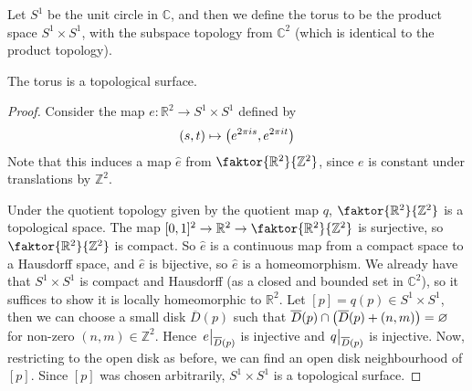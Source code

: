 \begin{example}
	Let \( S^1 \) be the unit circle in \( \mathbb C \), and then we define the torus to be the product space \( S^1 \times S^1 \), with the subspace topology from \( \mathbb C^2 \) (which is identical to the product topology).
	\begin{lemma}
		The torus is a topological surface.
	\end{lemma}
	\begin{proof}
		Consider the map \( e \colon \mathbb R^2 \to S^1 \times S^1 \) defined by
		\[
			(s,t) \mapsto \qty(e^{2\pi i s}, e^{2 \pi i t})
		\]
		Note that this induces a map \( \hat e \) from \( \faktor{\mathbb R^2}{\mathbb Z^2} \), since \( e \) is constant under translations by \( \mathbb Z^2 \).

		\ifdefined\hideproofs\else
		\begin{center}
		\end{center}
		\fi

		Under the quotient topology given by the quotient map \( q \), \( \faktor{\mathbb R^2}{\mathbb Z^2} \) is a topological space.
		The map \( [0,1]^2 \to \mathbb R^2 \to \faktor{\mathbb R^2}{\mathbb Z^2} \) is surjective, so \( \faktor{\mathbb R^2}{\mathbb Z^2} \) is compact.
		So \( \hat e \) is a continuous map from a compact space to a Hausdorff space, and \( \hat e \) is bijective, so \( \hat e \) is a homeomorphism.
		We already have that \( S^1 \times S^1 \) is compact and Hausdorff (as a closed and bounded set in \( \mathbb C^2 \)), so it suffices to show it is locally homeomorphic to \( \mathbb R^2 \).
		Let \( [p] = q(p) \in S^1 \times S^1 \), then we can choose a small disk \( \overline D(p) \) such that \( \overline D(p) \cap \qty(\overline D(p) + (n,m)) = \varnothing \) for non-zero \( (n,m) \in \mathbb Z^2 \).
		Hence \( \eval{e}_{\overline D(p)} \) is injective and \( \eval{q}_{\overline D(p)} \) is injective.
		Now, restricting to the open disk as before, we can find an open disk neighbourhood of \( [p] \).
		Since \( [p] \) was chosen arbitrarily, \( S^1 \times S^1 \) is a topological surface.
	\end{proof}
\end{example}

